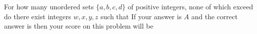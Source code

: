 For how many unordered sets $\{a,b,c,d\}$ of positive integers, none of which exceed  do there exist integers $w,x,y,z$ such that   If your answer is $A$ and the correct answer is  then your score on this problem will be 